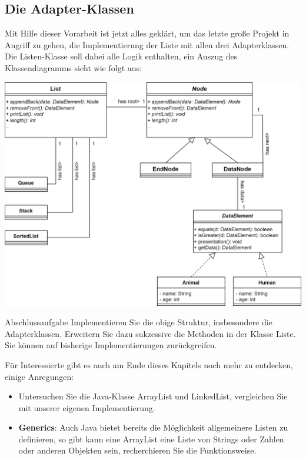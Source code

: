 \documentclass{article}
\begin{document}
\subsection{Die Adapter-Klassen}
Mit Hilfe dieser Vorarbeit ist jetzt alles geklärt, um das letzte große Projekt in Angriff zu gehen, die Implementierung der Liste mit allen drei Adapterklassen. \\
Die Listen-Klasse soll dabei alle Logik enthalten, ein Auszug des Klassendiagramms sieht wie folgt aus:
\begin{center}
    \includegraphics[scale=0.2]{../../media/adapter_lists.png}   
\end{center}
\begin{task}{Abschlussaufgabe}
Implementieren Sie die obige Struktur, insbesondere die Adapterklassen. Erweitern Sie dazu sukzessive die Methoden in der Klasse Liste. Sie können auf bisherige Implementierungen zurückgreifen. 
\end{task}
Für Interessierte gibt es auch am Ende dieses Kapitels noch mehr zu entdecken, einige Anregungen: 
\begin{itemize}
    \item Untersuchen Sie die Java-Klasse ArrayList und LinkedList, vergleichen Sie mit unserer eigenen Implementierung.
    \item \textbf{Generics}: Auch Java bietet bereits die Möglichkeit allgemeinere Listen zu definieren, so gibt kann eine ArrayList eine Liste von Strings oder Zahlen oder anderen Objekten sein, recherchieren Sie die Funktionsweise.
\end{itemize}
\end{document}
